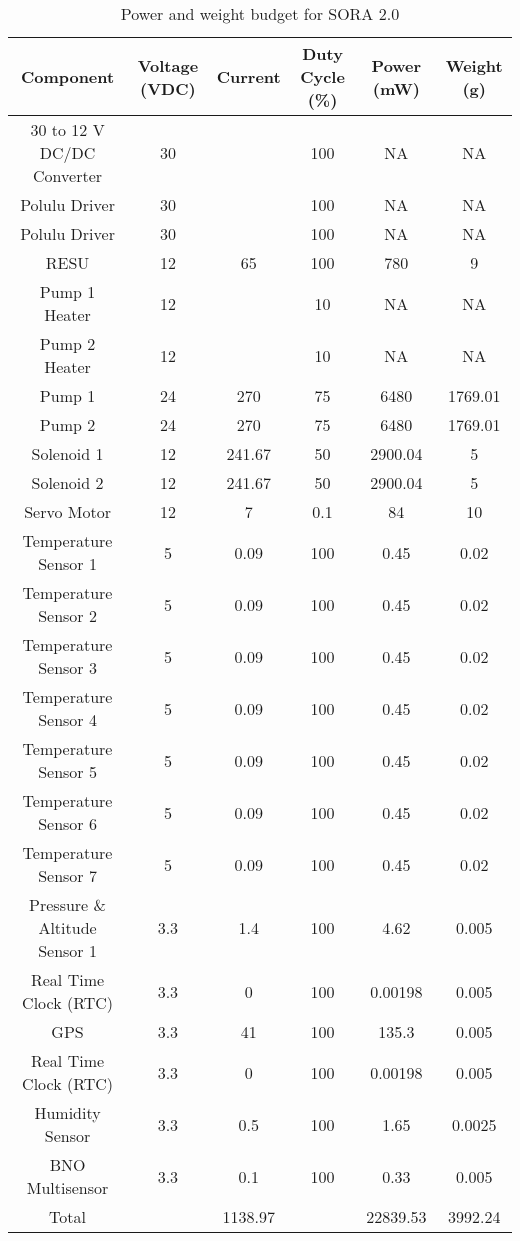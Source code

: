 \begin{table}[H]
\centering
\caption{Power and weight budget for SORA 2.0} 
\label{tab:budget}
\bigskip
\begin{tabular}{|c|c|c|c|c|c|}
\hline
\multicolumn{1}{|c|}{\bfseries Component} & \multicolumn{1}{c|}{\bfseries Voltage (VDC)} &  \multicolumn{1}{c|}{\bfseries Current} & \multicolumn{1}{c|}{\bfseries Duty Cycle (\%)} & \multicolumn{1}{c|}{\bfseries Power (mW)} & \multicolumn{1}{c|}{\bfseries Weight (g)} \\
\hline
    30 to 12 V DC/DC Converter & 30 &  & 100 & NA & NA \\ \hline
	Polulu Driver & 30 &  & 100 & NA & NA \\ \hline
	Polulu Driver & 30 &  & 100 & NA & NA \\ \hline
	RESU & 12 & 65 & 100 & 780 & 9 \\ \hline
	Pump 1 Heater & 12 &  & 10 & NA & NA \\ \hline
	Pump 2 Heater & 12 &  & 10 & NA & NA \\ \hline
	Pump 1 & 24 & 270 & 75 & 6480 & 1769.01 \\ \hline
	Pump 2 & 24 & 270 & 75 & 6480 & 1769.01 \\ \hline
	Solenoid 1 & 12 & 241.67 & 50 & 2900.04 & 5 \\ \hline
	Solenoid 2 & 12 & 241.67 & 50 & 2900.04 & 5 \\ \hline
	Servo Motor & 12 & 7 & 0.1 & 84 & 10 \\ \hline
	Temperature Sensor 1 & 5 & 0.09 & 100 & 0.45 & 0.02 \\ \hline
	Temperature Sensor 2 & 5 & 0.09 & 100 & 0.45 & 0.02 \\ \hline
	Temperature Sensor 3 & 5 & 0.09 & 100 & 0.45 & 0.02 \\ \hline
	Temperature Sensor 4 & 5 & 0.09 & 100 & 0.45 & 0.02 \\ \hline
	Temperature Sensor 5 & 5 & 0.09 & 100 & 0.45 & 0.02 \\ \hline
	Temperature Sensor 6 & 5 & 0.09 & 100 & 0.45 & 0.02 \\ \hline
	Temperature Sensor 7 & 5 & 0.09 & 100 & 0.45 & 0.02 \\ \hline
	Pressure \& Altitude Sensor 1 & 3.3 & 1.4 & 100 & 4.62 & 0.005 \\ \hline
	Real Time Clock (RTC) & 3.3 & 0 & 100 & 0.00198 & 0.005 \\ \hline
	GPS & 3.3 & 41 & 100 & 135.3 & 0.005 \\ \hline
	Real Time Clock (RTC) & 3.3 & 0 & 100 & 0.00198 & 0.005 \\ \hline
	Humidity Sensor & 3.3 & 0.5 & 100 & 1.65 & 0.0025 \\ \hline
	BNO Multisensor & 3.3 & 0.1 & 100 & 0.33 & 0.005 \\ \hline
	Total &  & 1138.97 &  & 22839.53 & 3992.24 \\ \hline
\end{tabular}
\medskip
\end{table}



